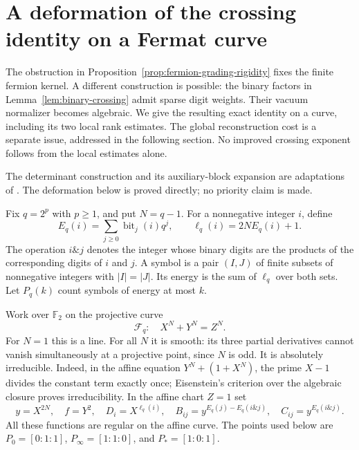 \section{A deformation of the crossing identity on a Fermat curve}\label{sec:deformed-crossing}
The obstruction in Proposition~\ref{prop:fermion-grading-rigidity} fixes the finite fermion kernel. A different construction is possible: the binary factors in Lemma~\ref{lem:binary-crossing} admit sparse digit weights. Their vacuum normalizer becomes algebraic. We give the resulting exact identity on a curve, including its two local rank estimates. The global reconstruction cost is a separate issue, addressed in the following section. No improved crossing exponent follows from the local estimates alone.

The determinant construction and its auxiliary-block expansion are adaptations of \cite[Appendix B.3]{Anthropic2026}. The deformation below is proved directly; no priority claim is made.

Fix $q=2^p$ with $p\geq1$, and put $N=q-1$. For a nonnegative integer $i$, define
\[
 E_q(i)=\sum_{j\geq0}\operatorname{bit}_j(i)q^j,
 \qquad \ell_q(i)=2N E_q(i)+1.
\]
The operation $i\mathbin{\&}j$ denotes the integer whose binary digits are the products of the corresponding digits of $i$ and $j$. A symbol is a pair $(I,J)$ of finite subsets of nonnegative integers with $|I|=|J|$. Its energy is the sum of $\ell_q$ over both sets. Let $P_q(k)$ count symbols of energy at most $k$.

Work over $\mathbb F_2$ on the projective curve
\[
 \mathcal F_q:\quad X^N+Y^N=Z^N.
\]
For $N=1$ this is a line. For all $N$ it is smooth: its three partial derivatives cannot vanish simultaneously at a projective point, since $N$ is odd. It is absolutely irreducible. Indeed, in the affine equation $Y^N+(1+X^N)$, the prime $X-1$ divides the constant term exactly once; Eisenstein's criterion over the algebraic closure proves irreducibility. In the affine chart $Z=1$ set
\[
 y=X^{2N},\quad f=Y^2,\quad D_i=X^{\ell_q(i)},\quad
 B_{ij}=y^{E_q(j)-E_q(i\mathbin{\&}j)},\quad
 C_{ij}=y^{E_q(i\mathbin{\&}j)}.
\]
All these functions are regular on the affine curve. The points used below are
$P_0=[0:1:1]$, $P_\infty=[1:1:0]$, and $P_*=[1:0:1]$.

